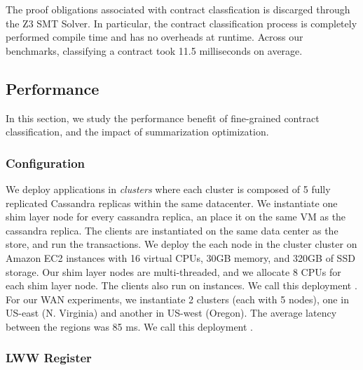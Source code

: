 The proof obligations associated with contract classfication is discarged
through the Z3 SMT Solver. In particular, the contract classification process
is completely performed compile time and has no overheads at runtime. Across
our benchmarks, classifying a contract took 11.5 milliseconds on average.

\subsection{Performance}

In this section, we study the performance benefit of fine-grained contract
classification, and the impact of summarization optimization.

\subsubsection{Configuration}

We deploy \name applications in \emph{clusters} where each cluster is composed
of 5 fully replicated Cassandra replicas within the same datacenter. We
instantiate one shim layer node for every cassandra replica, an place it on the
same VM as the cassandra replica. The clients are instantiated on the same data
center as the store, and run the transactions. We deploy the each node in the
cluster cluster on  Amazon EC2 instances with 16 virtual CPUs,
30GB memory, and 320GB of SSD storage. Our shim layer nodes are multi-threaded,
and we allocate 8 CPUs for each shim layer node. The clients also run on
 instances. We call this deployment . For our WAN
experiments, we instantiate 2 clusters (each with 5 nodes), one in US-east (N.
Virginia) and another in US-west (Oregon). The average latency between the
regions was 85 ms. We call this deployment .

\subsubsection{LWW Register}

